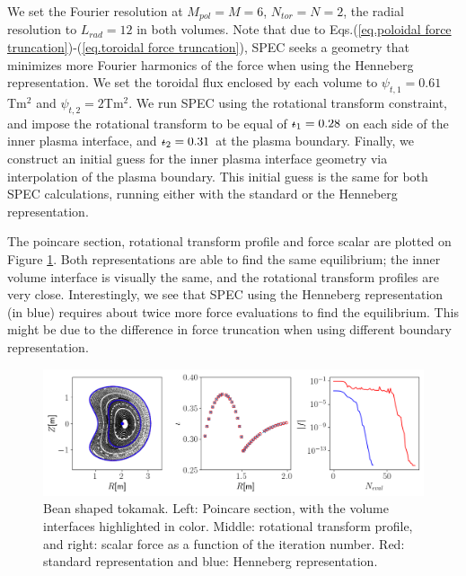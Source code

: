\documentclass[my_thesis.tex]{subfiles}
\begin{document}
We set the Fourier resolution at $M_{pol}=M=6$, $N_{tor}=N=2$, the radial resolution to $L_{rad}=12$ in both volumes. Note that due to Eqs.(\ref{eq.poloidal force truncation})-(\ref{eq.toroidal force truncation}), SPEC seeks a geometry that minimizes more Fourier harmonics of the force when using the Henneberg representation. We set the toroidal flux enclosed by each volume to $\psi_{t,1}=0.61$Tm${}^2$ and $\psi_{t,2}=2$Tm${}^2$. We run SPEC using the rotational transform constraint, and impose the rotational transform to be equal of $\text{$\iota\!\!$-}_1=0.28$ on each side of the inner plasma interface, and $\text{$\iota\!\!$-}_2=0.31$ at the plasma boundary. Finally, we construct an initial guess for the inner plasma interface geometry via interpolation of the plasma boundary. This initial guess is the same for both SPEC calculations, running either with the standard or the Henneberg representation.

The poincare section, rotational transform profile and force scalar are plotted on Figure \ref{fig. bean shape henneberg representation}. Both representations are able to find the same equilibrium; the inner volume interface is visually the same, and the rotational transform profiles are very close. Interestingly, we see that SPEC using the Henneberg representation (in blue) requires about twice more force evaluations to find the equilibrium. This might be due to the difference in force truncation when using different boundary representation.

\begin{figure}
	\centering
	\includegraphics[width=\linewidth]{images/HennebergRepresentation/BeanShape.png}
	\caption{Bean shaped tokamak. Left: Poincare section, with the volume interfaces highlighted in color. Middle: rotational transform profile, and right: scalar force as a function of the iteration number. Red: standard representation and blue: Henneberg representation.}
	\label{fig. bean shape henneberg representation}
\end{figure}
\end{document}
